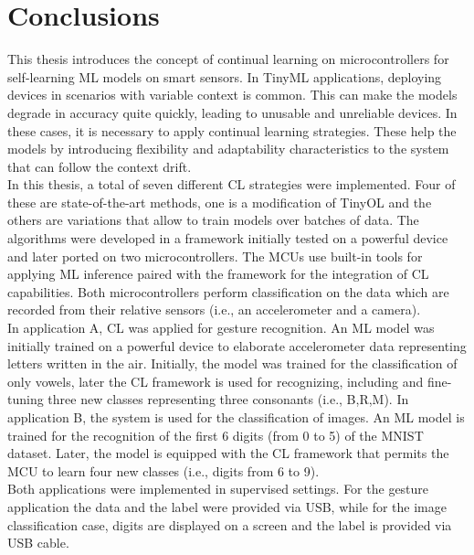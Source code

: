 \documentclass[12pt]{report}
\begin{document}
\chapter{Conclusions}
This thesis introduces the concept of continual learning on microcontrollers for self-learning ML models on smart sensors. In TinyML applications, deploying devices in scenarios with variable context is common. This can make the models degrade in accuracy quite quickly, leading to unusable and unreliable devices. In these cases, it is necessary to apply continual learning strategies. These help the models by introducing flexibility and adaptability characteristics to the system that can follow the context drift.\\
In this thesis, a total of seven different CL strategies were implemented. Four of these are state-of-the-art methods, one is a modification of TinyOL and the others are variations that allow to train models over batches of data. The algorithms were developed in a framework initially tested on a powerful device and later ported on two microcontrollers. The MCUs use built-in tools for applying ML inference paired with the framework for the integration of CL capabilities. Both microcontrollers perform classification on the data which are recorded from their relative sensors (i.e., an accelerometer and a camera).\\
In application A, CL was applied for gesture recognition. An ML model was initially trained on a powerful device to elaborate accelerometer data representing letters written in the air. Initially, the model was trained for the classification of only vowels, later the CL framework is used for recognizing, including and fine-tuning three new classes representing three consonants (i.e., B,R,M). 
In application B, the system is used for the classification of images. An ML model is trained for the recognition of the first 6 digits (from 0 to 5) of the MNIST dataset. Later, the model is equipped with the CL framework that permits the MCU to learn four new classes (i.e., digits from 6 to 9).\\
Both applications were implemented in supervised settings. For the gesture application the data and the label were provided via USB, while for the image classification case, digits are displayed on a screen and the label is provided via USB cable.
\end{document}
